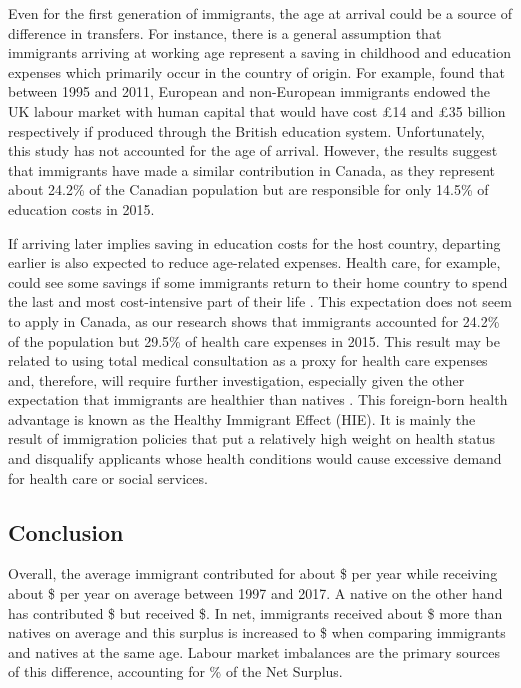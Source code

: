 \vspace{0.7em}\par
Even for the first generation of immigrants, the age at arrival could be a source of difference in transfers.
For instance, there is a general assumption that immigrants arriving at working age represent a saving in childhood and education expenses which primarily occur in the country of origin.
For example, \citet{Dustmann:2014dr} found that between 1995 and 2011, European and non-European immigrants endowed the UK labour market with human capital that would have cost \pounds14 and \pounds35 billion respectively if produced through the British education system.
Unfortunately, this study has not accounted for the age of arrival.
However, the results suggest that immigrants have made a similar contribution in Canada, as they represent about 24.2\% of the Canadian population but are responsible for only 14.5\% of education costs in 2015.

\vspace{0.7em}\par
If arriving later implies saving in education costs for the host country, departing earlier is also expected to reduce age-related expenses.
Health care, for example, could see some savings if some immigrants return to their home country to spend the last and most cost-intensive part of their life \citep{Bratsberg:2014cl}.
This expectation does not seem to apply in Canada, as our research shows that immigrants accounted for 24.2\% of the population but 29.5\% of health care expenses in 2015. This result may be related to using total medical consultation as a proxy for health care expenses and, therefore, will require further investigation, especially given the other expectation that immigrants are healthier than natives \citep{Ichou:2019ik,Vang:2016di}.
This foreign-born health advantage is known as the Healthy Immigrant Effect (HIE). It is mainly the result of immigration policies that put a relatively high weight on health status and disqualify applicants whose health conditions would cause excessive demand for health care or social services.

\subsection{Conclusion}

Overall, the average immigrant contributed for about \$ per year while receiving about \$ per year on average between 1997 and 2017.
A native on the other hand has contributed \$ but received \$.
In net, immigrants received about \$ more than natives on average and this surplus is increased to \$ when comparing immigrants and natives at the same age.
Labour market imbalances are the primary sources of this difference, accounting for \% of the Net Surplus.

